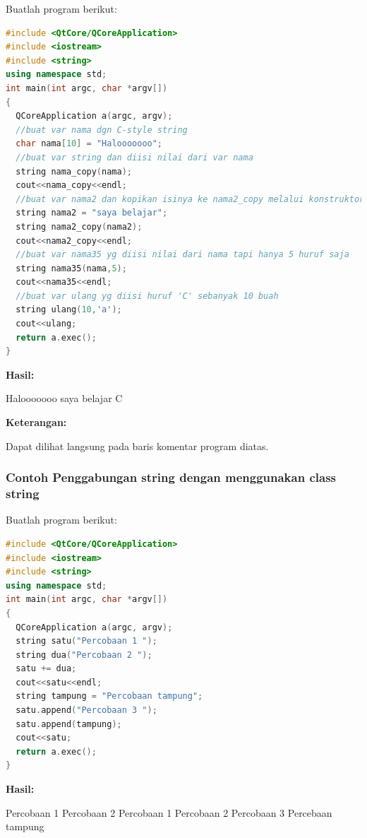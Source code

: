 Buatlah program berikut:

\begin{lstlisting}[language=c++, caption=Penggunaan class string untuk manipulasi data, label=contoh3-26]
#include <QtCore/QCoreApplication>
#include <iostream>
#include <string>
using namespace std;
int main(int argc, char *argv[])
{
  QCoreApplication a(argc, argv);
  //buat var nama dgn C-style string
  char nama[10] = "Halooooooo";
  //buat var string dan diisi nilai dari var nama
  string nama_copy(nama);
  cout<<nama_copy<<endl;
  //buat var nama2 dan kopikan isinya ke nama2_copy melalui konstruktor
  string nama2 = "saya belajar";
  string nama2_copy(nama2);
  cout<<nama2_copy<<endl;
  //buat var nama35 yg diisi nilai dari nama tapi hanya 5 huruf saja
  string nama35(nama,5);
  cout<<nama35<<endl;
  //buat var ulang yg diisi huruf 'C' sebanyak 10 buah
  string ulang(10,'a');
  cout<<ulang;
  return a.exec();
}
\end{lstlisting}

\textbf{Hasil:}

 \begin{lcverbatim}
 Halooooooo
 saya belajar
 C
 \end{lcverbatim}

\textbf{Keterangan:}

Dapat dilihat langsung pada baris komentar program diatas.

\subsubsection*{Contoh  Penggabungan string dengan menggunakan class string}

Buatlah program berikut:

\begin{lstlisting}[language=c++, caption=Penggabungan string dengan menggunakan class string, label=contoh3-27]
#include <QtCore/QCoreApplication>
#include <iostream>
#include <string>
using namespace std;
int main(int argc, char *argv[])
{
  QCoreApplication a(argc, argv);
  string satu("Percobaan 1 ");
  string dua("Percobaan 2 ");
  satu += dua;
  cout<<satu<<endl;
  string tampung = "Percobaan tampung";
  satu.append("Percobaan 3 ");
  satu.append(tampung);
  cout<<satu;
  return a.exec();
}
\end{lstlisting}

\textbf{Hasil:}
\begin{lcverbatim}
Percobaan 1 Percobaan 2
Percobaan 1 Percobaan 2 Percobaan 3 Percebaan tampung
\end{lcverbatim}


